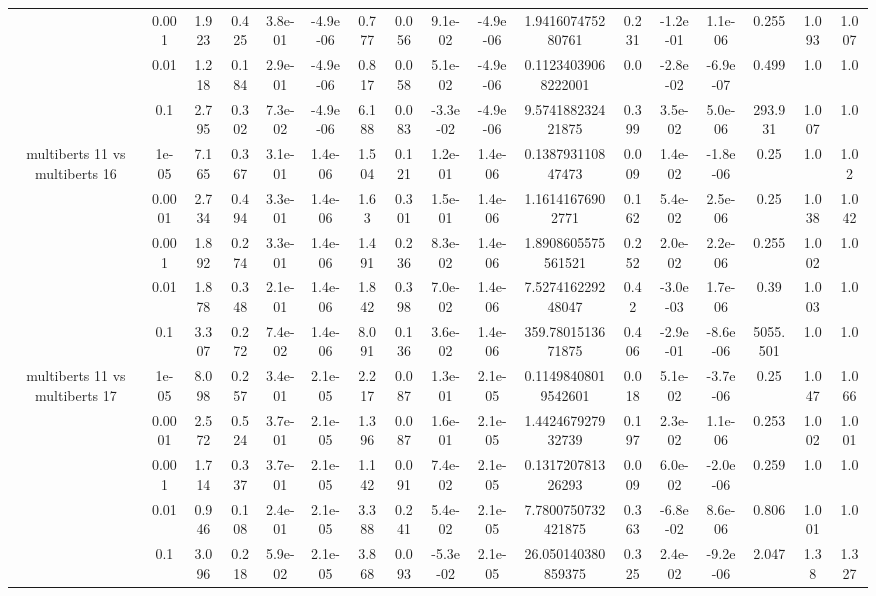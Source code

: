 \begin{tabular}{|c|c|c|c|c|c|c|c|c|c|c|c|c|c|c|c|c|}
 & 0.001 & 1.923 & 0.425 & 3.8e-01 & -4.9e-06 & 0.777 & 0.056 & 9.1e-02 & -4.9e-06 & 1.941607475280761 & 0.231 & -1.2e-01 & 1.1e-06 & 0.255 & 1.093 & 1.007 \\
 & 0.01 & 1.218 & 0.184 & 2.9e-01 & -4.9e-06 & 0.817 & 0.058 & 5.1e-02 & -4.9e-06 & 0.11234039068222001 & 0.0 & -2.8e-02 & -6.9e-07 & 0.499 & 1.0 & 1.0 \\
 & 0.1 & 2.795 & 0.302 & 7.3e-02 & -4.9e-06 & 6.188 & 0.083 & -3.3e-02 & -4.9e-06 & 9.574188232421875 & 0.399 & 3.5e-02 & 5.0e-06 & 293.931 & 1.007 & 1.0 \\
\hline
\multirow{5}{*}{multiberts 11 vs multiberts 16} & 1e-05 & 7.165 & 0.367 & 3.1e-01 & 1.4e-06 & 1.504 & 0.121 & 1.2e-01 & 1.4e-06 & 0.138793110847473 & 0.009 & 1.4e-02 & -1.8e-06 & 0.25 & 1.0 & 1.02 \\
 & 0.0001 & 2.734 & 0.494 & 3.3e-01 & 1.4e-06 & 1.63 & 0.301 & 1.5e-01 & 1.4e-06 & 1.16141676902771 & 0.162 & 5.4e-02 & 2.5e-06 & 0.25 & 1.038 & 1.042 \\
 & 0.001 & 1.892 & 0.274 & 3.3e-01 & 1.4e-06 & 1.491 & 0.236 & 8.3e-02 & 1.4e-06 & 1.8908605575561521 & 0.252 & 2.0e-02 & 2.2e-06 & 0.255 & 1.002 & 1.0 \\
 & 0.01 & 1.878 & 0.348 & 2.1e-01 & 1.4e-06 & 1.842 & 0.398 & 7.0e-02 & 1.4e-06 & 7.527416229248047 & 0.42 & -3.0e-03 & 1.7e-06 & 0.39 & 1.003 & 1.0 \\
 & 0.1 & 3.307 & 0.272 & 7.4e-02 & 1.4e-06 & 8.091 & 0.136 & 3.6e-02 & 1.4e-06 & 359.7801513671875 & 0.406 & -2.9e-01 & -8.6e-06 & 5055.501 & 1.0 & 1.0 \\
\hline
\multirow{5}{*}{multiberts 11 vs multiberts 17} & 1e-05 & 8.098 & 0.257 & 3.4e-01 & 2.1e-05 & 2.217 & 0.087 & 1.3e-01 & 2.1e-05 & 0.11498408019542601 & 0.018 & 5.1e-02 & -3.7e-06 & 0.25 & 1.047 & 1.066 \\
 & 0.0001 & 2.572 & 0.524 & 3.7e-01 & 2.1e-05 & 1.396 & 0.087 & 1.6e-01 & 2.1e-05 & 1.442467927932739 & 0.197 & 2.3e-02 & 1.1e-06 & 0.253 & 1.002 & 1.001 \\
 & 0.001 & 1.714 & 0.337 & 3.7e-01 & 2.1e-05 & 1.142 & 0.091 & 7.4e-02 & 2.1e-05 & 0.131720781326293 & 0.009 & 6.0e-02 & -2.0e-06 & 0.259 & 1.0 & 1.0 \\
 & 0.01 & 0.946 & 0.108 & 2.4e-01 & 2.1e-05 & 3.388 & 0.241 & 5.4e-02 & 2.1e-05 & 7.7800750732421875 & 0.363 & -6.8e-02 & 8.6e-06 & 0.806 & 1.001 & 1.0 \\
 & 0.1 & 3.096 & 0.218 & 5.9e-02 & 2.1e-05 & 3.868 & 0.093 & -5.3e-02 & 2.1e-05 & 26.050140380859375 & 0.325 & 2.4e-02 & -9.2e-06 & 2.047 & 1.38 & 1.327 \\

\end{tabular}
